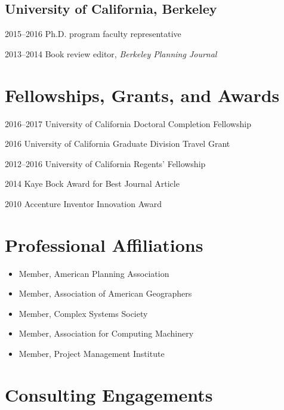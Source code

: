 \documentclass{mycv}
\begin{document}
\subsection*{University of California, Berkeley}

\begin{tablist}
\item[2015--2016] \tab Ph.D. program faculty representative
\item[2013--2014] \tab Book review editor, \emph{Berkeley Planning Journal}
\end{tablist}


\section*{Fellowships, Grants, and Awards}

\begin{tablist}
\item[2016--2017] \tab University of California Doctoral Completion Fellowship
\item[2016] \tab University of California Graduate Division Travel Grant
\item[2012--2016] \tab University of California Regents' Fellowship
\item[2014] \tab Kaye Bock Award for Best Journal Article
\item[2010] \tab Accenture Inventor Innovation Award
\end{tablist}



\section*{Professional Affiliations}

\begin{itemize}
\item Member, American Planning Association
\item Member, Association of American Geographers
\item Member, Complex Systems Society
\item Member, Association for Computing Machinery
\item Member, Project Management Institute
\end{itemize}



\section*{Consulting Engagements}
\end{document}
